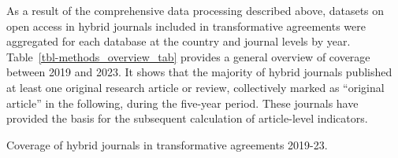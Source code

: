 \documentclass[a4paper,man,floatsintext,longtable,noextraspace,10pt]{apa6}
\begin{document}
As a result of the comprehensive data processing described above,
datasets on open access in hybrid journals included in transformative
agreements were aggregated for each database at the country and journal
levels by year. Table~\ref{tbl-methods_overview_tab} provides a general
overview of coverage between 2019 and 2023. It shows that the majority
of hybrid journals published at least one original research article or
review, collectively marked as ``original article'' in the following,
during the five-year period. These journals have provided the basis for
the subsequent calculation of article-level indicators.

\begin{table}

\caption{\label{tbl-methods_overview_tab}Coverage of hybrid journals in
transformative agreements 2019-23.}

\centering{

}
\end{table}
\end{document}
